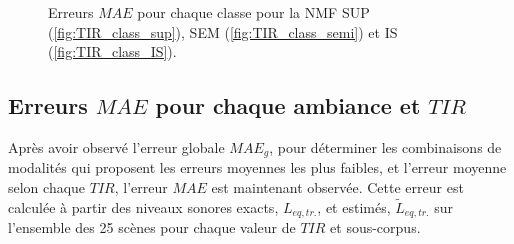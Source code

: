 \begin{figure}%
\centering
{}%
\qquad
{}%
\qquad
{}%
\caption{Erreurs $MAE$ pour chaque classe pour la NMF SUP (\ref{fig:TIR_class_sup}), SEM (\ref{fig:TIR_class_semi}) et IS (\ref{fig:TIR_class_IS}).}
\label{fig:TIR_bar}
\end{figure}


\subsection{Erreurs $MAE$ pour chaque ambiance et $TIR$}
Après avoir observé l'erreur globale $MAE_g$, pour déterminer les combinaisons de modalités qui proposent les erreurs moyennes les plus faibles, et l'erreur moyenne selon chaque $TIR$, l'erreur $MAE$ est maintenant observée. Cette erreur est calculée à partir des niveaux sonores exacts, $L_{eq,tr.}$, et estimés, $\tilde{L}_{eq,tr.}$ sur l'ensemble des 25 scènes pour chaque valeur de $TIR$ et sous-corpus. 

